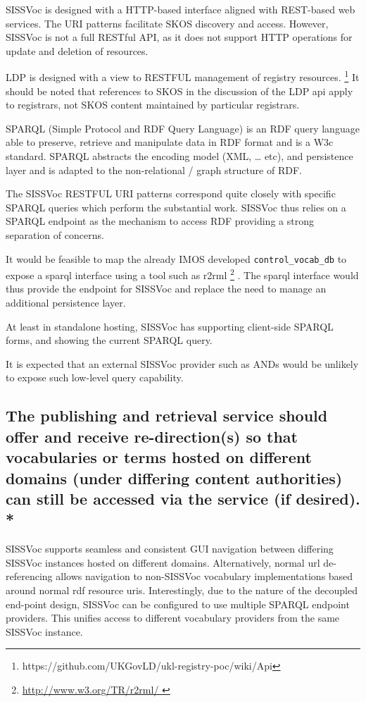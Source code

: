 \documentclass[10pt,a4paper]{article}
\begin{document}
\begin{flushleft}
    SISSVoc is designed with a HTTP-based interface aligned with REST-based web
services. The URI patterns facilitate SKOS discovery and access. However,
SISSVoc is not a full RESTful API, as it does not support HTTP operations for
update and deletion of resources.
    
    LDP is designed with a view to RESTFUL management of registry resources.
\footnote { https://github.com/UKGovLD/ukl-registry-poc/wiki/Api } It should be
noted that references to SKOS in the discussion of the LDP api apply to
registrars, not SKOS content maintained by particular registrars.  


    SPARQL (Simple Protocol and RDF Query Language) is an RDF query language
able to preserve, retrieve and manipulate data in RDF format and is a W3c
standard.  SPARQL abstracts the encoding model (XML, … etc), and persistence
layer and is adapted to the non-relational / graph structure of RDF.

    The SISSVoc RESTFUL URI patterns correspond quite closely with specific SPARQL queries
which perform the substantial work. SISSVoc thus relies on a SPARQL endpoint as the
mechanism to access RDF providing a strong separation of concerns.

    It would be feasible to map the already IMOS developed
\texttt{control\_vocab\_db} to expose a sparql interface using a tool such as
r2rml \footnote{ \url{ http://www.w3.org/TR/r2rml/ } } .  The sparql interface
would thus provide the endpoint for SISSVoc and replace the need to manage an
additional persistence layer.

	At least in standalone hosting, SISSVoc has supporting client-side SPARQL forms, 
	and showing the current SPARQL query.

    It is expected that an external SISSVoc provider such as ANDs would be
unlikely to expose such low-level query capability.
   

\subsection{ The publishing and retrieval service should offer and receive
re-direction(s) so that vocabularies or terms hosted on different domains (under
differing content authorities) can still be accessed via the service (if
desired). * }

{
SISSVoc supports seamless and consistent GUI navigation between differing
SISSVoc instances hosted on different domains.
%
Alternatively, normal url de-referencing allows navigation to non-SISSVoc
vocabulary implementations based around normal rdf resource uris.
%
Interestingly, due to the nature of the decoupled end-point design, SISSVoc 
can be configured to use multiple SPARQL endpoint providers. This unifies access
to different vocabulary providers from the same SISSVoc instance. 

}
\end{flushleft}
\end{document}
